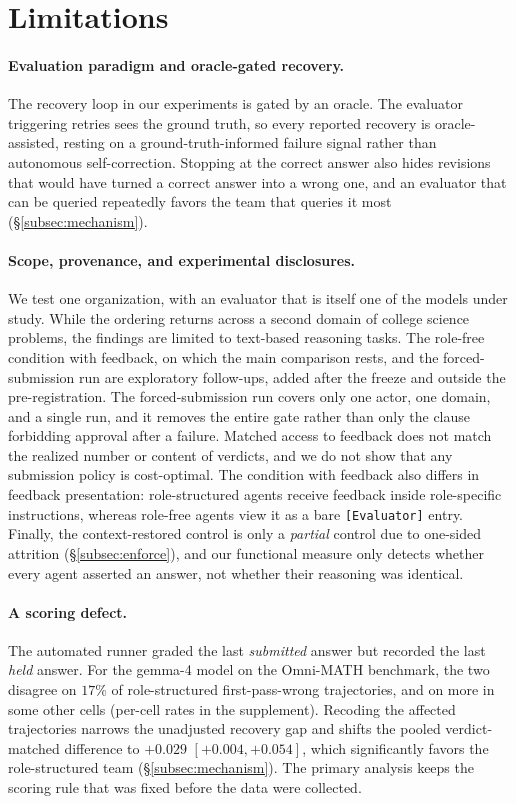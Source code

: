 \section{Limitations}
\label{sec:limitations}

\paragraph{Evaluation paradigm and oracle-gated recovery.} The recovery loop
in our experiments is gated by an oracle. The evaluator triggering retries
sees the ground truth, so every reported recovery is oracle-assisted, resting
on a ground-truth-informed failure signal rather than autonomous
self-correction.
Stopping at the correct answer also hides revisions that would have turned a
correct answer into a wrong one, and an evaluator that can be queried
repeatedly favors the team that queries it most (\S\ref{subsec:mechanism}).

\paragraph{Scope, provenance, and experimental disclosures.} We test one
\PER{} organization, with an evaluator that is itself one of the models
under study. While the ordering returns across a second domain of college
science problems, the findings are limited to text-based reasoning tasks.
The role-free condition with feedback, on which the main comparison rests,
and the forced-submission run are exploratory follow-ups, added after the
freeze and outside the pre-registration. The forced-submission
run covers only one actor, one domain, and a single run, and it removes the
entire gate rather than only the clause forbidding approval after a failure.
Matched access to feedback does not match the realized number or content
of verdicts, and we do not show that any submission policy is cost-optimal.
The condition with feedback also differs in feedback presentation:
role-structured agents receive feedback inside role-specific instructions,
whereas role-free agents view it as a bare \texttt{[Evaluator]} entry.
Finally, the context-restored control is only a \emph{partial} control due
to one-sided attrition (\S\ref{subsec:enforce}), and our functional measure
only detects whether every agent asserted an answer, not whether their
reasoning was identical.

\paragraph{A scoring defect.} The automated runner graded the last
\emph{submitted} answer but recorded the last \emph{held} answer. For the
gemma-4 model on the Omni-MATH benchmark, the two disagree on $17\%$ of
role-structured first-pass-wrong trajectories, and on more in some other
cells (per-cell rates in the supplement). Recoding the affected trajectories
narrows the unadjusted recovery gap and shifts the pooled verdict-matched
difference to $+0.029$ $[+0.004,+0.054]$, which significantly favors the
role-structured team (\S\ref{subsec:mechanism}). The primary analysis keeps
the scoring rule that was fixed before the data were collected.
